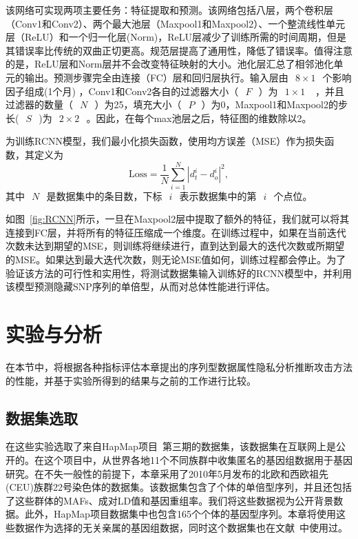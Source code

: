 该网络可实现两项主要任务：特征提取和预测。该网络包括八层，两个卷积层（Conv1和Conv2）、两个最大池层（Maxpool1和Maxpool2）、一个整流线性单元层（ReLU）和一个归一化层(Norm)，ReLU层减少了训练所需的时间周期，但是其错误率比传统的双曲正切更高。规范层提高了通用性，降低了错误率。值得注意的是，ReLU层和Norm层并不会改变特征映射的大小。池化层汇总了相邻池化单元的输出。预测步骤完全由连接（FC）层和回归层执行。输入层由~$~8\times 1~$~个影响因子组成(1个月) ，Conv1和Conv2各自的过滤器大小（~$~F~$~）为~$~1\times 1~$~ ，并且过滤器的数量（~$~N~$~）为25，填充大小（~$~P~$~）为0，Maxpool1和Maxpool2的步长(~$~S~$~)为~$~2\times 2~$~。因此，在每个max池层之后，特征图的维数除以2。


为训练RCNN模型，我们最小化损失函数，使用均方误差（MSE）作为损失函数，其定义为
\begin{equation}
\text{Loss}=\frac{1}{N}\sum_{i=1}^{N}|d_{t}^{i}-d_{o}^{i}|^{2},
\end{equation}
其中~$~N~$~是数据集中的条目数，下标~$~i~$~表示数据集中的第~$~i~$~个点位。


如图~\ref{fig:RCNN}所示，一旦在Maxpool2层中提取了额外的特征，我们就可以将其连接到FC层，并将所有的特征压缩成一个维度。在训练过程中，如果在当前迭代次数未达到期望的MSE，则训练将继续进行，直到达到最大的迭代次数或所期望的MSE。如果达到最大迭代次数，则无论MSE值如何，训练过程都会停止。为了验证该方法的可行性和实用性，将测试数据集输入训练好的RCNN模型中，并利用该模型预测隐藏SNP序列的单倍型，从而对总体性能进行评估。


\section{实验与分析}\label{sec:resul}
在本节中，将根据各种指标评估本章提出的序列型数据属性隐私分析推断攻击方法的性能，并基于实验所得到的结果与之前的工作进行比较。

\subsection{数据集选取}
在这些实验选取了来自HapMap项目~\cite{thorisson2005international}第三期的数据集，该数据集在互联网上是公开的。在这个项目中，从世界各地11个不同族群中收集匿名的基因组数据用于基因研究。在不失一般性的前提下，本章采用了2010年5月发布的北欧和西欧祖先(CEU)族群22号染色体的数据集。该数据集包含了个体的单倍型序列，并且还包括了这些群体的MAFs、成对LD值和基因重组率。我们将这些数据视为公开背景数据。此外，HapMap项目数据集中也包含165个个体的基因型序列。本章将使用这些数据作为选择的无关亲属的基因组数据，同时这个数据集也在文献~\cite{samani2015quantifying}中使用过。
